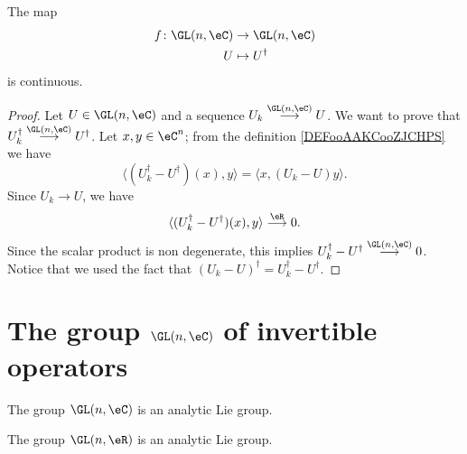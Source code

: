 \begin{lemma}        \label{LEMooZILJooFfDEAF}
	The map
	\begin{equation}
		\begin{aligned}
			f\colon \GL(n,\eC) & \to \GL(n,\eC)   \\
			U                  & \mapsto U^{\dag}
		\end{aligned}
	\end{equation}
	is continuous.
\end{lemma}

\begin{proof}
	Let \( U\in\GL(n,\eC)\) and a sequence \( U_k\stackrel{\GL(n,\eC)}{\longrightarrow}U\). We want to prove that \( U_k^{\dag}\stackrel{\GL(n,\eC)}{\longrightarrow}U^{\dag}\). Let \( x,y\in \eC^n\); from the definition \ref{DEFooAAKCooZJCHPS} we have
	\begin{equation}
		\langle (U_k^{\dag}-U^{\dag})(x),y \rangle =\langle x, (U_k-U)y \rangle .
	\end{equation}
	Since \( U_k\to U\), we have
	\begin{equation}
		\langle (U_k^{\dag}-U^{\dag})(x),y \rangle \stackrel{\eR}{\longrightarrow}0.
	\end{equation}
	Since the scalar product is non degenerate, this implies \( U_k^{\dag}-U^{\dag}\stackrel{\GL(n,\eC)}{\longrightarrow}0\). Notice that we used the fact that \( (U_k-U)^{\dag}=U_k^{\dag}-U^{\dag}\).
\end{proof}

\section{The group \texorpdfstring{$ \GL(n,\eC)$}{GLnC} of invertible operators}

\begin{proposition}     \label{PROPooWRVKooLfqLfV}
	The group \( \GL(n,\eC)\) is an analytic Lie group.
\end{proposition}

\begin{proposition}		\label{PROPooPZABooXxQkFi}
	The group \( \GL(n,\eR)\) is an analytic Lie group.
\end{proposition}

